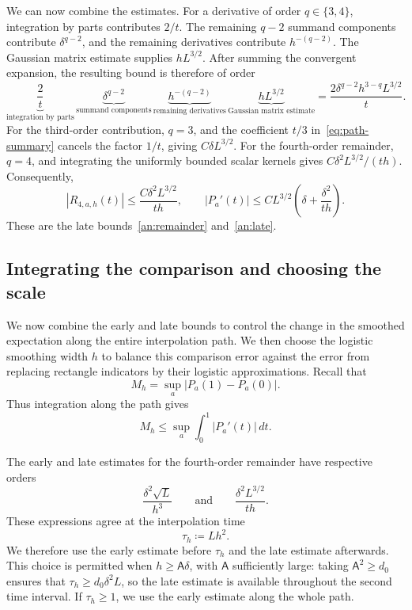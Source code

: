 \documentclass[11pt,letterpaper]{article}
\theoremstyle{remark}
\newcommand{\dd}{\,d}
\begin{document}
We can now combine the estimates. For a derivative of order
\(q\in\{3,4\}\), integration by parts contributes \(2/t\). The
remaining \(q-2\) summand components contribute \(\delta^{q-2}\),
and the remaining derivatives contribute \(h^{-(q-2)}\). The
Gaussian matrix estimate supplies \(hL^{3/2}\). After summing the
convergent expansion, the resulting bound is therefore of order
\[
 \underbrace{\frac2t}_{\text{integration by parts}}\,
 \underbrace{\delta^{q-2}}_{\text{summand components}}\,
 \underbrace{h^{-(q-2)}}_{\text{remaining derivatives}}\,
 \underbrace{hL^{3/2}}_{\text{Gaussian matrix estimate}}
 =\frac{2\delta^{q-2}h^{3-q}L^{3/2}}{t}.
\]
For the third-order contribution, \(q=3\), and the coefficient
\(t/3\) in~\eqref{eq:path-summary} cancels the factor \(1/t\),
giving \(C\delta L^{3/2}\). For the fourth-order remainder, \(q=4\),
and integrating the uniformly bounded scalar kernels gives
\(C\delta^2L^{3/2}/(th)\). Consequently,
\[
 |R_{4,a,h}(t)|\le\frac{C\delta^2L^{3/2}}{th},
 \qquad
 |P_a'(t)|\le CL^{3/2}\left(\delta+\frac{\delta^2}{th}\right).
\]
These are the late bounds~\eqref{an:remainder} and~\eqref{an:late}.


\subsection{\texorpdfstring{Integrating the comparison and choosing the scale}{Integrating the comparison and choosing the scale}}\label{sec:rate}
We now combine the early and late bounds to control the change in the
smoothed expectation along the entire interpolation path. We then
choose the logistic smoothing width \(h\) to balance this comparison
error against the error from replacing rectangle indicators by their
logistic approximations. Recall that
\[
 M_h=\sup_a|P_a(1)-P_a(0)|.
\]
Thus integration along the path gives
\[
 M_h\le\sup_a\int_0^1|P_a'(t)|\dd t.
\]

The early and late estimates for the fourth-order remainder have
respective orders
\[
 \frac{\delta^2\sqrt L}{h^3}
 \qquad\text{and}\qquad
 \frac{\delta^2L^{3/2}}{th}.
\]
These expressions agree at the interpolation time
\[
 \tau_h\coloneqq Lh^2.
\]
We therefore use the early estimate before \(\tau_h\) and the late
estimate afterwards. This choice is permitted when
\(h\ge\mathsf A\delta\), with \(\mathsf A\) sufficiently large:
taking \(\mathsf A^2\ge d_0\) ensures that
\(\tau_h\ge d_0\delta^2L\), so the late estimate is available
throughout the second time interval. If \(\tau_h\ge1\), we use the
early estimate along the whole path.
\end{document}
